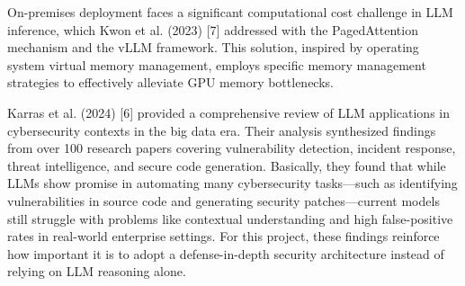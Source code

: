 On-premises deployment faces a significant computational cost challenge in LLM inference, which Kwon et al. (2023) [7] addressed with the PagedAttention mechanism and the vLLM framework. This solution, inspired by operating system virtual memory management, employs specific memory management strategies to effectively alleviate GPU memory bottlenecks.

Karras et al. (2024) [6] provided a comprehensive review of LLM applications in cybersecurity contexts in the big data era. Their analysis synthesized findings from over 100 research papers covering vulnerability detection, incident response, threat intelligence, and secure code generation. Basically, they found that while LLMs show promise in automating many cybersecurity tasks---such as identifying vulnerabilities in source code and generating security patches---current models still struggle with problems like contextual understanding and high false-positive rates in real-world enterprise settings. For this project, these findings reinforce how important it is to adopt a defense-in-depth security architecture instead of relying on LLM reasoning alone.
\newpage

